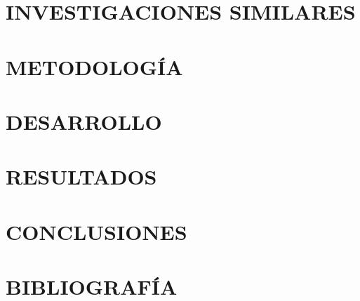 \documentclass[12pt]{article}
\begin{document}
    \newpage
    \section{INVESTIGACIONES SIMILARES}

    \newpage
    \section{METODOLOGÍA}

    \newpage
    \section{DESARROLLO}

    \newpage
    \section{RESULTADOS}

    \newpage
    \section{CONCLUSIONES}

    \newpage
    \section{BIBLIOGRAFÍA}
\end{document}
